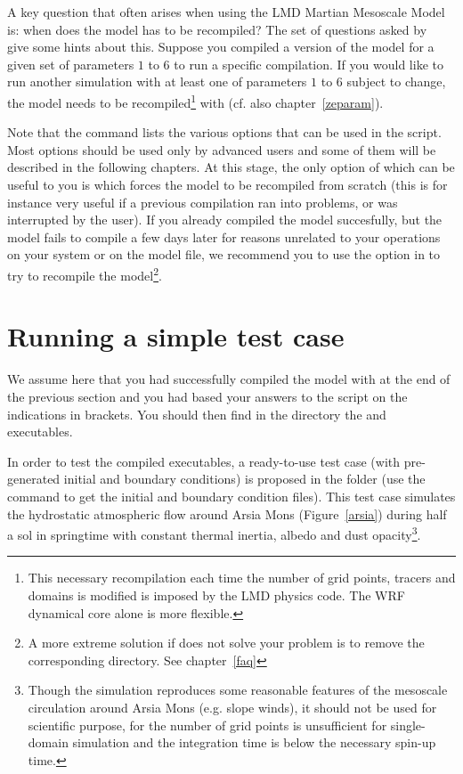 \mk
A key question that often arises when using the LMD Martian Mesoscale Model is: when does the model has to be recompiled? The set of questions asked by~ give some hints about this. Suppose you compiled a version of the model for a given set of parameters $1$ to $6$ to run a specific compilation. If you would like to run another simulation with at least one of parameters $1$ to $6$ subject to change, the model needs to be recompiled\footnote{This necessary recompilation each time the number of grid points, tracers and domains is modified is imposed by the LMD physics code. The WRF dynamical core alone is more flexible.} with  (cf. also chapter~\ref{zeparam}).

\mk
Note that the  command lists the various options that can be used in the  script. Most options should be used only by advanced users and some of them will be described in the following chapters. At this stage, the only option of  which can be useful to you is  which forces the model to be recompiled from scratch (this is for instance very useful if a previous compilation ran into problems, or was interrupted by the user). If you already compiled the model succesfully, but the model fails to compile a few days later for reasons unrelated to your operations on your system or on the model file, we recommend you to use the  option in  to try to recompile the model\footnote{A more extreme solution if  does not solve your problem is to remove the corresponding  directory. See chapter~\ref{faq}}.

\scriptsize
{}
\normalsize

\mk
\section{Running a simple test case}
\label{sc:arsia}

\sk
We assume here that you had successfully compiled the model with  at the end of the previous section and you had based your answers to the  script on the indications in brackets. You should then find in the  directory the  and~ executables.

\sk
In order to test the compiled executables, a ready-to-use test case (with pre-generated initial and boundary conditions) is proposed in the  folder (use the  command to get the initial and boundary condition files). This test case simulates the hydrostatic atmospheric flow around Arsia Mons (Figure~\ref{arsia}) during half a sol in springtime with constant thermal inertia, albedo and dust opacity\footnote{Though the simulation reproduces some reasonable features of the mesoscale circulation around Arsia Mons (e.g. slope winds), it should not be used for scientific purpose, for the number of grid points is unsufficient for single-domain simulation and the integration time is below the necessary spin-up time.}.

